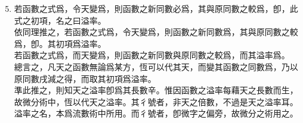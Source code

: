 \begin{enumerate} [label={第\chinese*款}]
	\setcounter{enumi}{4}
	\item 若函數之式爲\CJKmove，令天變爲\CJKmove，則函數之新同數必爲\CJKmove，其與原同數之較爲\CJKmove，卽\CJKmove，此式之初項\CJKmove，名之曰溢率。\\
	依同理推之，若函數之式爲\CJKmove，令天變爲\CJKmove，則函數之新同數爲\CJKmove，其與原同數之較爲\CJKmove，卽\CJKmove。其初項\CJKmove 爲溢率。\\
	若函數之式爲\CJKmove，而天變爲\CJKmove，則函數之新同數與原同數之較爲\CJKmove，而其溢率爲\CJKmove。\\
	總言之，凡天之函數無論爲某方，恆可以\CJKmove 代其天，而變其函數之同數爲\CJKmove，乃以原同數戌減之得\CJKmove，而取其初項\CJKmove 爲溢率。\\
	準此推之，則知天之溢率卽爲其長數辛。惟因函數之溢率每藉天之長數而生，故微分術中，恆以\CJKmove 代天之溢率。其彳號者，非天之倍數，不過是天之溢率耳。溢率之名，本爲流數術中所用。而彳號者，卽微字之偏旁，故微分之術用之。\\

\end{enumerate}
